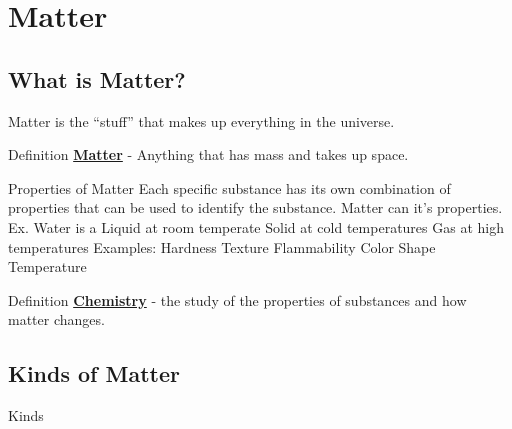 \documentclass[../../main.tex]{subfiles}
\begin{document}
\chapter{Matter}

\section{What is Matter?}
\begin{outline}[enumerate]
    \1 \colorbox{dracPink}{Matter is the “stuff” that makes up everything in the universe.}

    \begin{displayquote}
        \begin{boxBox}{Definition}
            {\large\textbf{\underline{Matter}}} - Anything that has mass and takes up space.
        \end{boxBox}
    \end{displayquote}

    \1 Properties of Matter
    \2 Each specific substance has its own combination of properties that can be used to identify the substance.
    \2 \colorbox{dracPink}{Matter can  it's properties.}
    \3 Ex. Water is a
    \4 Liquid at room temperate
    \4 Solid at cold temperatures
    \4 Gas at high temperatures
    \2 Examples:
    \3 Hardness
    \3 Texture
    \3 Flammability
    \3 Color
    \3 Shape
    \3 Temperature

    \begin{displayquote}
        \begin{boxBox}{Definition}
            {\large\textbf{\underline{Chemistry}}} - the study of the properties of substances and how matter changes.
        \end{boxBox}
    \end{displayquote}

    \section{Kinds of Matter}


     Kinds

\end{outline}
\end{document}
